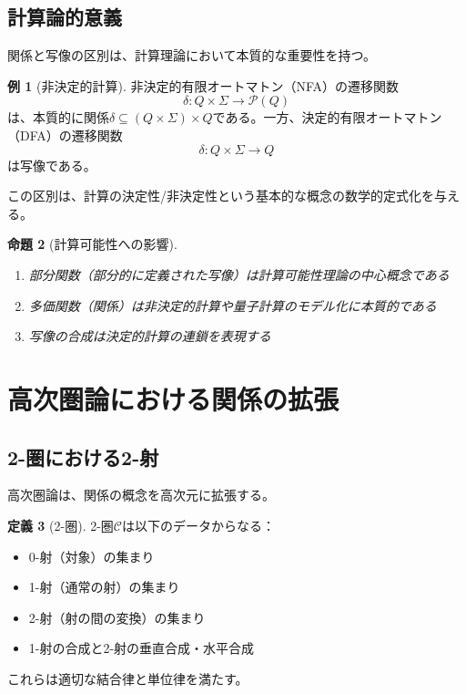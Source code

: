 \documentclass[11pt,a4paper,twocolumn]{ltjsarticle}
\theoremstyle{definition}
\newtheorem{definition}{定義}[section]
\newtheorem{example}[definition]{例}
\theoremstyle{plain}
\newtheorem{proposition}[definition]{命題}
\begin{document}
\subsection{計算論的意義}

関係と写像の区別は、計算理論において本質的な重要性を持つ。

\begin{example}[非決定的計算]
非決定的有限オートマトン（NFA）の遷移関数
\[
\delta: Q \times \Sigma \to \mathcal{P}(Q)
\]
は、本質的に関係$\delta \subseteq (Q \times \Sigma) \times Q$である。一方、決定的有限オートマトン（DFA）の遷移関数
\[
\delta: Q \times \Sigma \to Q
\]
は写像である。
\end{example}

この区別は、計算の決定性/非決定性という基本的な概念の数学的定式化を与える。

\begin{proposition}[計算可能性への影響]
\begin{enumerate}
\item 部分関数（部分的に定義された写像）は計算可能性理論の中心概念である
\item 多価関数（関係）は非決定的計算や量子計算のモデル化に本質的である
\item 写像の合成は決定的計算の連鎖を表現する
\end{enumerate}
\end{proposition}

\section{高次圏論における関係の拡張}

\subsection{2-圏における2-射}

高次圏論は、関係の概念を高次元に拡張する。

\begin{definition}[2-圏]
2-圏$\mathcal{C}$は以下のデータからなる：
\begin{itemize}
\item 0-射（対象）の集まり
\item 1-射（通常の射）の集まり
\item 2-射（射の間の変換）の集まり
\item 1-射の合成と2-射の垂直合成・水平合成
\end{itemize}
これらは適切な結合律と単位律を満たす。
\end{definition}
\end{document}
